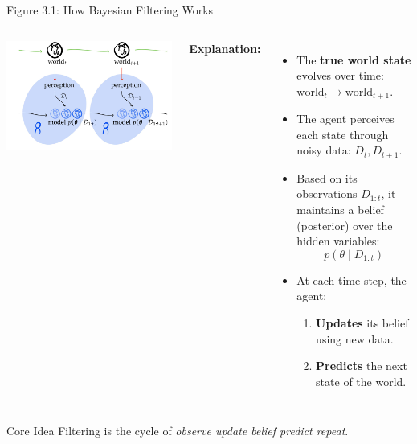 \documentclass[handout,aspectratio=169]{beamer}
\begin{document}
\begin{frame}{Figure 3.1: How Bayesian Filtering Works}

\begin{columns}
\includegraphics[width=\linewidth]{chapter_figs/02_figs/3_1.png} 

\textbf{Explanation:}
\begin{itemize}
  \item The \textbf{true world state} evolves over time: \( \text{world}_t \to \text{world}_{t+1} \).
  \item The agent perceives each state through noisy data: \( D_t, D_{t+1} \).
  \item Based on its observations \( D_{1:t} \), it maintains a belief (posterior) over the hidden variables: 
  \[
  p(\theta \mid D_{1:t})
  \]
  \item At each time step, the agent:
  \begin{enumerate}
    \item \textbf{Updates} its belief using new data.
    \item \textbf{Predicts} the next state of the world.
  \end{enumerate}
\end{itemize}
\end{columns}

\begin{block}{Core Idea}
Filtering is the cycle of \textit{observe \rightarrow update belief \rightarrow  predict \rightarrow  repeat}.
\end{block}

\end{frame}
\end{document}
